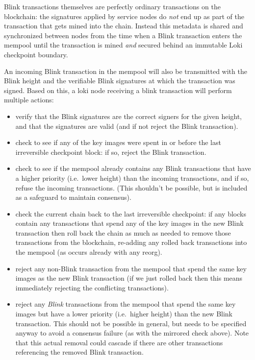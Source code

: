 Blink transactions themselves are perfectly ordinary transactions on the
blockchain: the signatures applied by service nodes do \emph{not} end up
as part of the transaction that gets mined into the chain. Instead this
metadata is shared and synchronized between nodes from the time when a
Blink transaction enters the mempool until the transaction is mined
\emph{and} secured behind an immutable Loki checkpoint boundary.

An incoming Blink transaction in the mempool will also be transmitted
with the Blink height and the verifiable Blink signatures at which the
transaction was signed. Based on this, a loki node receiving a blink
transaction will perform multiple actions:

\begin{itemize}
\tightlist
\item
  verify that the Blink signatures are the correct signers for the given
  height, and that the signatures are valid (and if not reject the Blink
  transaction).
\item
  check to see if any of the key images were spent in or before the last
  irreversible checkpoint block: if so, reject the Blink transaction.
\item
  check to see if the mempool already contains any Blink transactions
  that have a higher priority (i.e.~lower height) than the incoming
  transactions, and if so, refuse the incoming transactions. (This
  shouldn't be possible, but is included as a safeguard to maintain
  consensus).
\item
  check the current chain back to the last irreversible checkpoint: if
  any blocks contain any transactions that spend any of the key images
  in the new Blink transaction then roll back the chain as much as
  needed to remove those transactions from the blockchain, re-adding any
  rolled back transactions into the mempool (as occurs already with any
  reorg).
\item
  reject any non-Blink transaction from the mempool that spend the same
  key images as the new Blink transaction (if we just rolled back then
  this means immediately rejecting the conflicting transactions).
\item
  reject any \emph{Blink} transactions from the mempool that spend the
  same key images but have a lower priority (i.e.~higher height) than
  the new Blink transaction. This should not be possible in general, but
  needs to be specified anyway to avoid a consensus failure (as with the
  mirrored check above). Note that this actual removal could cascade if
  there are other transactions referencing the removed Blink
  transaction.
\end{itemize}


